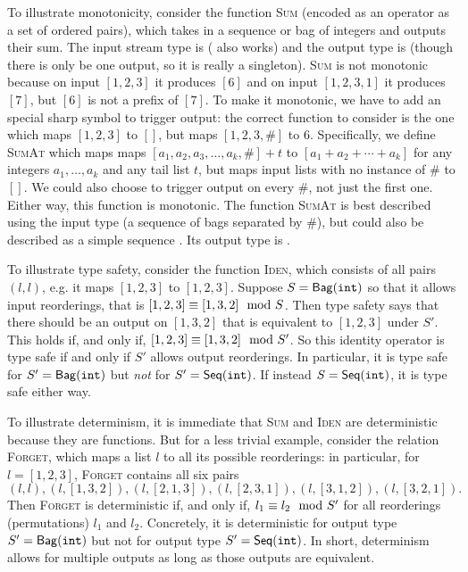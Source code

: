 To illustrate monotonicity, consider the function \textsc{Sum} (encoded as an operator as a set of ordered pairs), which takes in a sequence or bag of integers and outputs their sum.
The input stream type is \seqint{} (\relint{} also works)
and the output type is \seqint{} (though there is only be one output, so it is really a singleton).
\textsc{Sum} is not monotonic because on input $[1, 2, 3]$ it produces $[6]$ and on input $[1, 2, 3, 1]$ it produces $[7]$, but $[6]$ is not a prefix of $[7]$. To make it monotonic, we have to add an special sharp symbol to trigger output: the correct function to consider is the one which maps $[1, 2, 3]$ to $[]$, but maps $[1, 2, 3, \#]$ to $6$.
Specifically, we define \textsc{SumAt} which maps
maps $[a_1, a_2, a_3, \ldots, a_k, \#] + t$ to $[a_1 + a_2 + \cdots + a_k]$ for any integers $a_1, \ldots, a_k$ and any tail list $t$, but maps input lists with no instance of $\#$ to $[]$.
We could also choose to trigger output on every $\#$, not just the first one.
Either way, this function is monotonic.
The function \textsc{SumAt} is best described using the input type \synchrelint{} (a sequence of bags separated by $\#$), but could also be described as a simple sequence \seqint{}. Its output type is \seqint{}.

To illustrate type safety, consider the function \textsc{Iden}, which consists of all pairs $(l, l)$, e.g. it maps $[1, 2, 3]$ to $[1, 2, 3]$.
Suppose $S = \mathsf{Bag}({\texttt{int}}){}$ so that it allows input reorderings, that is $[1, 2, 3] \equiv [1, 3, 2] \mod {S}$.
Then type safety says that there should be an output on $[1, 3, 2]$ that is equivalent to $[1, 2, 3]$ under $S'$.
This holds if, and only if, $[1, 2, 3] \equiv [1, 3, 2] \mod {S'}$.
So this identity operator is type safe if and only if $S'$ allows output reorderings.
In particular, it is type safe for $S' = \mathsf{Bag}({\texttt{int}}){}$ but \emph{not} for $S' = \mathsf{Seq}({\texttt{int}}){}$.
If instead $S = \mathsf{Seq}({\texttt{int}}){}$, it is type safe either way.

To illustrate determinism, it is immediate that \textsc{Sum} and \textsc{Iden} are deterministic because they are functions. But for a less trivial example, consider the relation \textsc{Forget}, which maps a list $l$ to all its possible reorderings: in particular, for $l = [1, 2, 3]$, \textsc{Forget} contains all six pairs
\[
(l, l), (l, [1, 3, 2]), (l, [2, 1, 3]), (l, [2, 3, 1]), (l, [3, 1, 2]), (l, [3, 2, 1]).
\]
Then \textsc{Forget} is deterministic if, and only if, $l_1 \equiv l_2 \mod {S'}$ for all reorderings (permutations) $l_1$ and $l_2$.
Concretely, it is deterministic for output type $S' = \mathsf{Bag}({\texttt{int}}){}$ but not for output type $S' = \mathsf{Seq}({\texttt{int}}){}$.
In short, determinism allows for multiple outputs as long as those outputs are equivalent.

